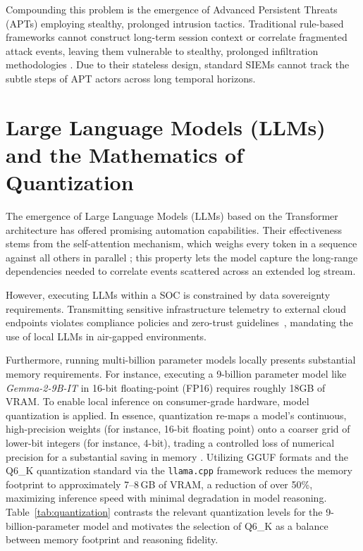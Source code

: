 Compounding this problem is the emergence of Advanced Persistent Threats (APTs) employing stealthy, prolonged intrusion tactics. Traditional rule-based frameworks cannot construct long-term session context or correlate fragmented attack events, leaving them vulnerable to stealthy, prolonged infiltration methodologies \cite{apt_stealth2021}. Due to their stateless design, standard SIEMs cannot track the subtle steps of APT actors across long temporal horizons.

\section{Large Language Models (LLMs) and the Mathematics of Quantization}

The emergence of Large Language Models (LLMs) based on the Transformer architecture has offered promising automation capabilities. Their effectiveness stems from the self-attention mechanism, which weighs every token in a sequence against all others in parallel \cite{vaswani2017}; this property lets the model capture the long-range dependencies needed to correlate events scattered across an extended log stream.

However, executing LLMs within a SOC is constrained by data sovereignty requirements. Transmitting sensitive infrastructure telemetry to external cloud endpoints violates compliance policies and zero-trust guidelines~\cite{nist80207}, mandating the use of local LLMs in air-gapped environments.

Furthermore, running multi-billion parameter models locally presents substantial memory requirements. For instance, executing a 9-billion parameter model like \textit{Gemma-2-9B-IT} in 16-bit floating-point (FP16) requires roughly 18GB of VRAM. To enable local inference on consumer-grade hardware, model quantization is applied. In essence, quantization re-maps a model's continuous, high-precision weights (for instance, 16-bit floating point) onto a coarser grid of lower-bit integers (for instance, 4-bit), trading a controlled loss of numerical precision for a substantial saving in memory \cite{quantization2021}. Utilizing GGUF formats and the Q6\_K quantization standard via the \texttt{llama.cpp} framework reduces the memory footprint to approximately 7--8\,GB of VRAM, a reduction of over 50\%, maximizing inference speed with minimal degradation in model reasoning. Table~\ref{tab:quantization} contrasts the relevant quantization levels for the 9-billion-parameter model and motivates the selection of Q6\_K as a balance between memory footprint and reasoning fidelity.

